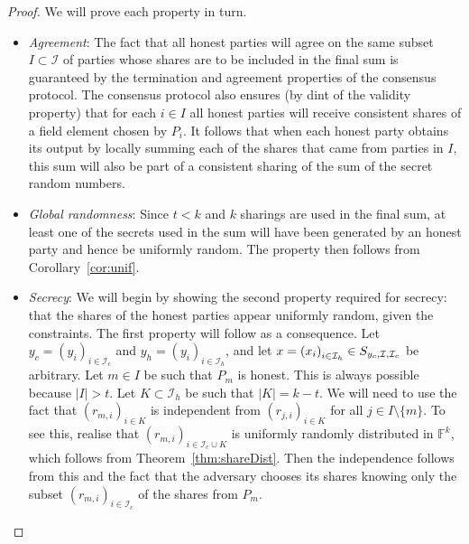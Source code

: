 \documentclass{article}
\theoremstyle{remark}
\newcommand{\F}{\mathbb{F}}
\begin{document}
\begin{proof}
	We will prove each property in turn.

	\begin{itemize}
		\item \textit{Agreement}: The fact that all honest parties will agree
			on the same subset $I \subset \mathcal{I}$ of parties whose shares
			are to be included in the final sum is guaranteed by the
			termination and agreement properties of the consensus protocol. The
			consensus protocol also ensures (by dint of the validity property)
			that for each $i \in I$ all honest parties will receive consistent
			shares of a field element chosen by $P_i$. It follows that when
			each honest party obtains its output by locally summing each of the
			shares that came from parties in $I$, this sum will also be part of
			a consistent sharing of the sum of the secret random numbers.

		\item \textit{Global randomness}: Since $t < k$ and $k$ sharings are
			used in the final sum, at least one of the secrets used in the sum
			will have been generated by an honest party and hence be uniformly
			random. The property then follows from Corollary~\ref{cor:unif}.

		\item \textit{Secrecy}: We will begin by showing the second property
			required for secrecy: that the shares of the honest parties appear
			uniformly random, given the constraints. The first property will
			follow as a consequence. Let
			$y_c = {(y_i)}_{i \in \mathcal{I}_c}$
			and
			$y_h = {(y_i)}_{i \in \mathcal{I}_h}$,
			and let
			$x = {(x_i)}_{i \in \mathcal{I}_h}
			\in
			S_{y_c, \mathcal{I}, \mathcal{I}_c}$
			be arbitrary. Let $m \in I$ be such that $P_m$ is honest. This is
			always possible because $|I| > t$. Let
			$K \subset \mathcal{I}_h$
			be such that $|K| = k - t$. We will need to use the fact that
			${(r_{m, i})}_{i \in K}$
			is independent from
			${(r_{j, i})}_{i \in K}$
			for all $j \in I \setminus \{m\}$. To see this, realise that
			${(r_{m, i})}_{i \in \mathcal{I}_c \cup K}$
			is uniformly randomly distributed in $\F^k$, which follows
			from Theorem~\ref{thm:shareDist}. Then the independence follows
			from this and the fact that the adversary chooses its shares
			knowing only the subset
			${(r_{m, i})}_{i \in \mathcal{I}_c}$
			of the shares from $P_m$.


\end{itemize}
\end{proof}
\end{document}
